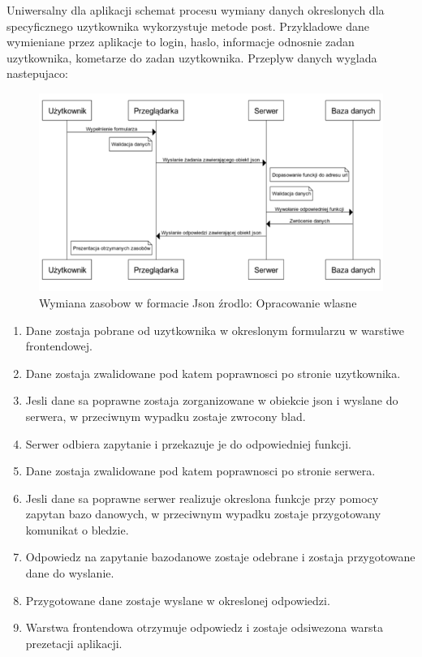 \documentclass[12pt]{report}
\begin{document}
 Uniwersalny dla aplikacji schemat procesu wymiany danych okreslonych dla specyficznego uzytkownika wykorzystuje metode post. Przykladowe dane wymieniane przez aplikacje to login, haslo, informacje odnosnie zadan uzytkownika, kometarze do zadan uzytkownika. Przeplyw danych wyglada nastepujaco:
 \begin{figure}[!hb]
\centering
\includegraphics[width=\textwidth,height=\textheight,keepaspectratio]{U-P-S-B.png} 
\caption{Wymiana zasobow w formacie Json źrodlo: Opracowanie wlasne}
\end{figure}
\begin{enumerate}
\item Dane zostaja pobrane od uzytkownika w okreslonym formularzu w warstiwe frontendowej.
\item Dane zostaja zwalidowane pod katem poprawnosci po stronie uzytkownika.
\item Jesli dane sa poprawne zostaja zorganizowane w obiekcie json i wyslane do serwera, w przeciwnym wypadku zostaje zwrocony blad.
\item Serwer odbiera zapytanie i przekazuje je do odpowiedniej funkcji.
\item Dane zostaja zwalidowane pod katem poprawnosci po stronie serwera.
\item Jesli dane sa poprawne serwer realizuje okreslona funkcje przy pomocy zapytan bazo danowych, w przeciwnym wypadku zostaje przygotowany komunikat o bledzie.
\item Odpowiedz na zapytanie bazodanowe zostaje odebrane i zostaja przygotowane dane do wyslanie.
\item Przygotowane dane zostaje wyslane w okreslonej odpowiedzi.
\item Warstwa frontendowa otrzymuje odpowiedz i zostaje odsiwezona warsta prezetacji aplikacji.
\end{enumerate}
 
\end{document}

